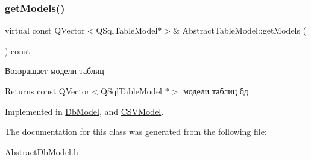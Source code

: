 \subsubsection{\texorpdfstring{get\+Models()}{getModels()}}
{\footnotesize\ttfamily virtual const Q\+Vector$<$Q\+Sql\+Table\+Model$\ast$$>$\& Abstract\+Table\+Model\+::get\+Models (\begin{DoxyParamCaption}{ }\end{DoxyParamCaption}) const\hspace{0.3cm}{\ttfamily [pure virtual]}}



Возвращает модели таблиц 

\begin{DoxyReturn}{Returns}
const Q\+Vector$<$\+Q\+Sql\+Table\+Model $\ast$$>$ модели таблиц бд 
\end{DoxyReturn}


Implemented in \mbox{\hyperlink{class_db_model_abc8c110a4d9fa82bbf9cf6152331b645}{Db\+Model}}, and \mbox{\hyperlink{class_c_s_v_model_adf61a056aa4dcb63471cb982a6f24e46}{C\+S\+V\+Model}}.



The documentation for this class was generated from the following file\+:\begin{DoxyCompactItemize}
\item 
Abstract\+Db\+Model.\+h\end{DoxyCompactItemize}
